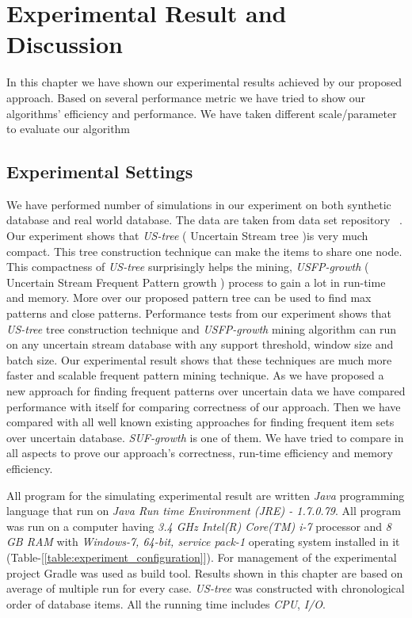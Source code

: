 %
\chapter{Experimental Result and Discussion}
In this chapter we have shown our experimental results achieved by our proposed approach. Based on several performance metric we have tried to show our algorithms' efficiency and performance. We have taken different scale/parameter to evaluate our algorithm


\section{Experimental Settings}
We have performed number of simulations in our experiment on both synthetic database and real world database. The data are taken from data set repository ~\cite{dataset}. Our experiment shows that \emph{US-tree} ( Uncertain Stream tree )is very much compact. This tree construction technique can make the items to share one node. This compactness of \emph{US-tree} surprisingly helps the mining, \emph{USFP-growth} ( Uncertain Stream Frequent Pattern growth ) process to gain a lot in run-time and memory. More over our proposed pattern tree can be used to find max patterns and close patterns. Performance tests from our experiment shows that \emph{US-tree} tree construction technique and \emph{USFP-growth} mining algorithm can run on any uncertain stream database with any support threshold, window size and batch size. Our experimental result shows that these techniques are much more faster and scalable frequent pattern mining technique. As we have proposed a new approach for finding frequent patterns over uncertain data we have compared performance with itself for comparing correctness of our approach. Then we have compared with all well known existing approaches for finding frequent item sets over uncertain database. \emph{SUF-growth} is one of them. We have tried to compare in all aspects to prove our approach's correctness, run-time efficiency and memory efficiency.

All program for the simulating experimental result are written \emph{Java} programming language that run on \emph{Java Run time Environment (JRE) - 1.7.0.79}. All program was run on a computer having \emph{3.4 GHz Intel(R) Core(TM) i-7} processor and \emph{8 GB RAM} with \emph{Windows-7, 64-bit, service pack-1} operating system installed in it (Table-[\ref{table:experiment_configuration}]). For management of the experimental project Gradle was used as build tool. Results shown in this chapter are based on average of multiple run for every case. \emph{US-tree} was constructed with chronological order of database items. All the running time includes \emph{CPU}, \emph{I/O}.\\
